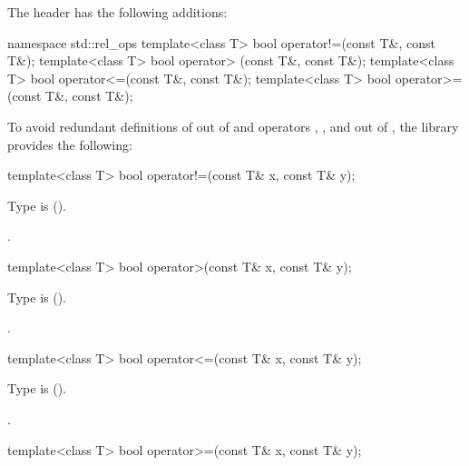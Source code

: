 \pnum
The header  has the following additions:
\begin{codeblock}
namespace std::rel_ops {
  template<class T> bool operator!=(const T&, const T&);
  template<class T> bool operator> (const T&, const T&);
  template<class T> bool operator<=(const T&, const T&);
  template<class T> bool operator>=(const T&, const T&);
}
\end{codeblock}

\pnum
To avoid redundant definitions of  out of 
and operators \tcode{>}, \tcode{<=}, and \tcode{>=} out of ,
the library provides the following:
%
\begin{itemdecl}
template<class T> bool operator!=(const T& x, const T& y);
\end{itemdecl}

\begin{itemdescr}
\pnum
\requires
Type  is  ().

\pnum
\returns
{}.
\end{itemdescr}

%
\begin{itemdecl}
template<class T> bool operator>(const T& x, const T& y);
\end{itemdecl}

\begin{itemdescr}
\pnum
\requires
Type  is  ().

\pnum
\returns
{}.
\end{itemdescr}

%
\begin{itemdecl}
template<class T> bool operator<=(const T& x, const T& y);
\end{itemdecl}

\begin{itemdescr}
\pnum
\requires
Type  is  ().

\pnum
\returns
{}.
\end{itemdescr}

%
\begin{itemdecl}
template<class T> bool operator>=(const T& x, const T& y);
\end{itemdecl}

